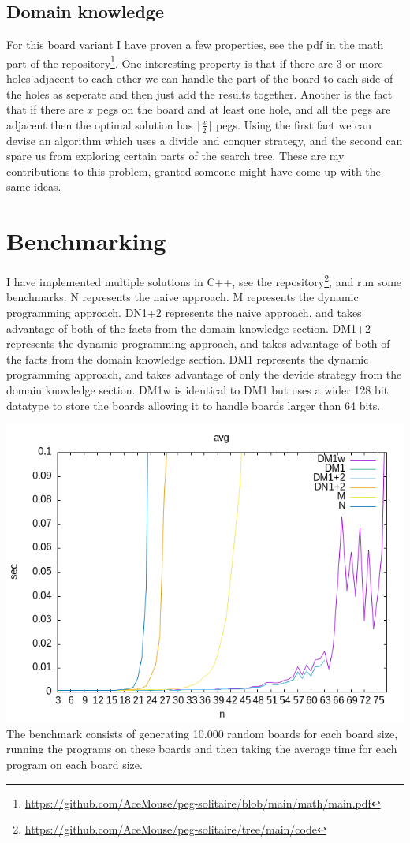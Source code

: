\documentclass{article}
\begin{document}
\subsection{Domain knowledge}
For this board variant I have proven a few properties, see the pdf in the math part of the repository\footnote{\url{https://github.com/AceMouse/peg-solitaire/blob/main/math/main.pdf}}. One interesting property is that if there are 3 or more holes adjacent to each other we can handle the part of the board to each side of the holes as seperate and then just add the results together. Another is the fact that if there are $x$ pegs on the board and at least one hole, and all the pegs are adjacent then the optimal solution has $\lceil\frac{x}{2}\rceil$ pegs. Using the first fact we can devise an algorithm which uses a divide and conquer strategy, and the second can spare us from exploring certain parts of the search tree. These are my contributions to this problem, granted someone might have come up with the same ideas. 

\section{Benchmarking}
I have implemented multiple solutions in C++, see the repository\footnote{\url{https://github.com/AceMouse/peg-solitaire/tree/main/code}}, and run some benchmarks:
N represents the naive approach. 
M represents the dynamic programming approach. 
DN1+2 represents the naive approach, and takes advantage of both of the facts from the domain knowledge section. 
DM1+2 represents the dynamic programming approach, and takes advantage of both of the facts from the domain knowledge section. 
DM1 represents the dynamic programming approach, and takes advantage of only the devide strategy from the domain knowledge section. 
DM1w is identical to DM1 but uses a wider 128 bit datatype to store the boards allowing it to handle boards larger than 64 bits. 

\includegraphics[width=\textwidth]{./cpp_comparison}
The benchmark consists of generating 10.000 random boards for each board size, running the programs on these boards and then taking the average time for each program on each board size.
\end{document}
